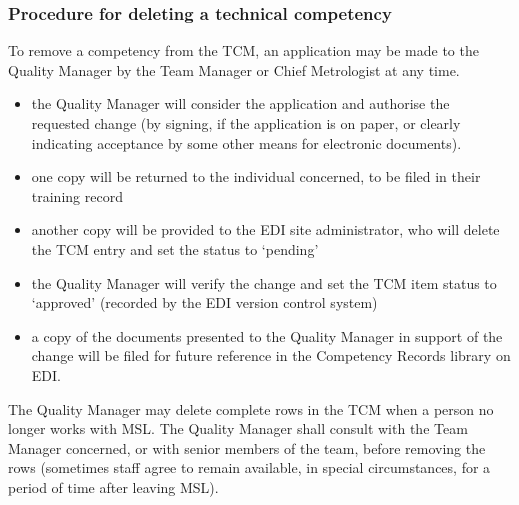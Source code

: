 \subsubsection{Procedure for deleting a technical competency}

To remove a competency from the TCM, an application may be made to the Quality Manager by the Team Manager or Chief Metrologist at any time.

\begin{itemize}
\item the Quality Manager will consider the application and authorise the requested change (by signing, if the application is on paper, or clearly indicating acceptance by some other means for electronic documents).

\item one copy will be returned to the individual concerned, to be filed in their training record

\item another copy will be provided to the EDI site administrator, who will delete the TCM entry and set the status to `pending' 

\item the Quality Manager will verify the change and set the TCM item status to ‘approved' (recorded by the EDI version control system)

\item a copy of the documents presented to the Quality Manager in support of the change will be filed for future reference in the Competency Records library on EDI.
\end{itemize}

The Quality Manager may delete complete rows in the TCM when a person no longer works with MSL. The Quality Manager shall consult with the Team Manager concerned, or with senior members of the team, before removing the rows (sometimes staff agree to remain available, in special circumstances, for a period of time after leaving MSL).
